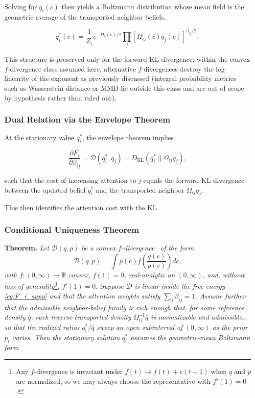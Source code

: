 \documentclass[twoside,11pt]{article}
\begin{document}
Solving for $q_i(c)$ then yields a Boltzmann distribution whose mean field is the geometric average of the transported neighbor beliefs.

\begin{equation}
q_i^*(c)
= \frac{1}{Z_i}
e^{-H_i(c)/2}
\prod_j
[\Omega_{ij}(c) q_j(c)]^{\beta_{ij}/2},
\label{eq:q_i_star_supp}
\end{equation}

This structure is preserved only for the forward KL divergence; within the convex $f$-divergence class assumed here, alternative $f$-divergences destroy the log-linearity of the exponent as previously discussed (integral probability metrics such as Wasserstein distance or MMD lie outside this class and are out of scope by hypothesis rather than ruled out).

\subsubsection{Dual Relation via the Envelope Theorem}
At the stationary value $q_i^*$, the envelope theorem implies

\begin{equation}
\frac{\partial F_i}{\partial \beta_{ij}}
= \mathcal{D}(q_i^*, q_j)
= D_{\mathrm{KL}}(q_i^* \| \Omega_{ij} q_j),
\label{eq:envelope_supp}
\end{equation}

such that the cost of increasing attention to $j$ equals the forward KL divergence between the updated belief $q_i^*$ and the transported neighbor $\Omega_{ij} q_j$.

This then identifies the attention cost with the KL.

\subsubsection{Conditional Uniqueness Theorem}
\label{thm:uniqueness_supp}

\textbf{Theorem.} \textit{Let\/ $\mathcal{D}(q,p)$ be a convex $f$-divergence~\citep{Csiszar1967} of the form
\[
\mathcal{D}(q,p)
= \int p(c) f \left(\frac{q(c)}{p(c)}\right)dc,
\]
with $f:(0,\infty)\to\mathbb{R}$ convex, $f(1)=0$, real-analytic on $(0,\infty)$, and, without loss of generality\footnote{Any $f$-divergence is invariant under $f(t)\mapsto f(t)+c(t-1)$ when $q$ and $p$ are normalized, so we may always choose the representative with $f'(1)=0$.}, $f'(1)=0$. Suppose $\mathcal{D}$ is linear inside the free energy \eqref{eq:F_i_supp} and that the attention weights satisfy $\sum_j\beta_{ij}=1$. Assume further that the admissible neighbor-belief family is rich enough that, for some reference density $\bar{q}$, each inverse-transported density $\Omega_{ij}^{-1}\bar{q}$ is normalizable and admissible, so that the realized ratios $q_i^*/\bar{q}$ sweep an open subinterval of $(0,\infty)$ as the prior $p_i$ varies. Then the stationary solution $q_i^*$ assumes the geometric-mean Boltzmann form}
\end{document}
